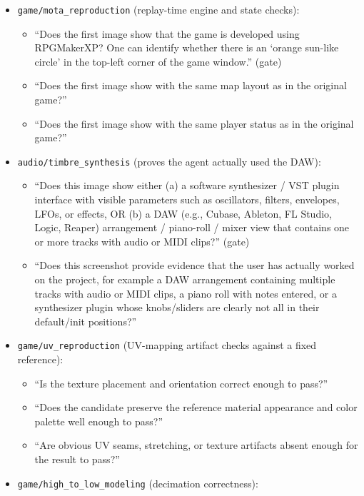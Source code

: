 \begin{itemize}[nosep,leftmargin=1.2em]
    \item \texttt{game/mota\_reproduction} (replay-time engine and state checks):
    \begin{itemize}[nosep,leftmargin=1.2em]
        \item ``Does the first image show that the game is developed using RPGMakerXP? One can identify whether there is an `orange sun-like circle' in the top-left corner of the game window.'' (gate)
        \item ``Does the first image show with the same map layout as in the original game?''
        \item ``Does the first image show with the same player status as in the original game?''
    \end{itemize}
    \item \texttt{audio/timbre\_synthesis} (proves the agent actually used the DAW):
    \begin{itemize}[nosep,leftmargin=1.2em]
        \item ``Does this image show either (a) a software synthesizer / VST plugin interface with visible parameters such as oscillators, filters, envelopes, LFOs, or effects, OR (b) a DAW (e.g., Cubase, Ableton, FL Studio, Logic, Reaper) arrangement / piano-roll / mixer view that contains one or more tracks with audio or MIDI clips?'' (gate)
        \item ``Does this screenshot provide evidence that the user has actually worked on the project, for example a DAW arrangement containing multiple tracks with audio or MIDI clips, a piano roll with notes entered, or a synthesizer plugin whose knobs/sliders are clearly not all in their default/init positions?''
    \end{itemize}
    \item \texttt{game/uv\_reproduction} (UV-mapping artifact checks against a fixed reference):
    \begin{itemize}[nosep,leftmargin=1.2em]
        \item ``Is the texture placement and orientation correct enough to pass?''
        \item ``Does the candidate preserve the reference material appearance and color palette well enough to pass?''
        \item ``Are obvious UV seams, stretching, or texture artifacts absent enough for the result to pass?''
    \end{itemize}
    \item \texttt{game/high\_to\_low\_modeling} (decimation correctness):

\end{itemize}
